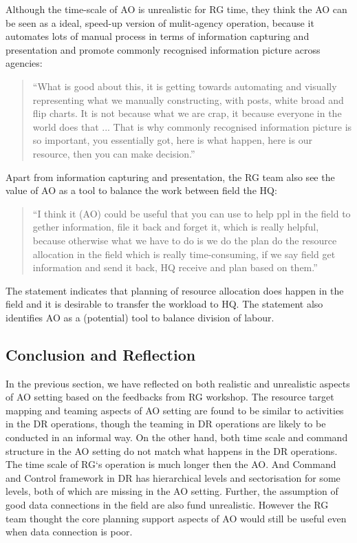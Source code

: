 Although the time-scale of \ac{AO} is unrealistic for \ac{RG} time,  they think the \ac{AO} can be seen as a ideal, speed-up version of mulit-agency operation, because it automates lots of manual process in terms of information capturing and presentation and promote commonly recognised information picture across agencies:

\begin{quotation}
``What is good about this, it is getting towards automating and visually representing what we manually constructing, with posts, white broad and flip charts. It is not because what we are crap, it because everyone in the world does that ...  That is why commonly recognised information picture is so important, you essentially got, here is what happen, here is our resource, then you can make decision.''
\end{quotation}

Apart from information capturing and presentation, the \ac{RG} team also see the value of \ac{AO} as a tool to balance the work between field the HQ: 

\begin{quotation}
``I think it (\ac{AO}) could be useful that you can use to help ppl in the field to gether information, file it back and forget it, which is really helpful, because otherwise what we have to do is we do the plan do the resource allocation in the field which is really time-consuming, if we say field get information and send it back, HQ receive and plan based on them.''
\end{quotation}

The statement indicates that planning of resource allocation does happen in the field and it is desirable to transfer the workload to HQ. The statement also identifies \ac{AO} as a (potential) tool to balance division of labour. \\


\subsection{Conclusion and Reflection}
In the previous section, we have reflected on both realistic and unrealistic aspects of \ac{AO} setting based on the feedbacks from \ac{RG} workshop. The resource target mapping and teaming aspects of \ac{AO} setting are found to be similar to activities in the DR operations, though the teaming in DR operations are likely to be conducted in an informal way. On the other hand, both time scale and command structure in the \ac{AO} setting do not match what happens in the DR operations. The time scale of RG`s operation is much longer then the \ac{AO}. And Command and Control framework in \ac{DR} has hierarchical levels and sectorisation for some levels, both of which are missing in the \ac{AO} setting. Further, the assumption of good data connections in the field are also fund unrealistic. However the \ac{RG} team thought the core planning support aspects of \ac{AO} would still be useful even when data connection is poor. \\

